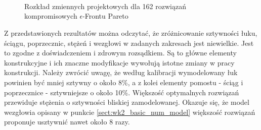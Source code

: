 \begin{figure}[p]
	 \\
	 \\
	 \\
	
	
	\captionsetup{justification=centering}
	\caption{Rozkład zmiennych projektowych dla 162 rozwiązań kompromisowych $\epsilon$-Frontu Pareto}
	\label{fig: calibration_histogramy}
\end{figure}

Z przedstawionych rezultatów można odczytać, że zróżnicowanie sztywności łuku, ściągu, poprzecznic, stężeń i wezgłowi w zadanych zakresach jest niewielkie. Jest to zgodne z doświadczeniem i zdrowym rozsądkiem. Są to główne elementy konstrukcyjne i ich znaczne modyfikacje wywołują istotne zmiany w pracy konstrukcji. Należy zwrócić uwagę, że według kalibracji wymodelowany łuk powinien być mniej sztywny o około 8\%, a z kolei elementy pomostu - ściąg i poprzecznice - sztywniejsze o około 10\%. Większość optymalnych rozwiązań przewiduje stężenia o sztywności bliskiej zamodelowanej. Okazuje się, że model wezgłowia opisany w punkcie \ref{sect:wk2_basic_num_model} większość rozwiązań proponuje usztywnić nawet około 8 razy. 

